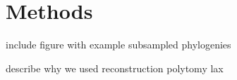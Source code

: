 \section{Methods} \label{sec:methods}

include figure with example subsampled phylogenies

describe why we used reconstruction polytomy lax
